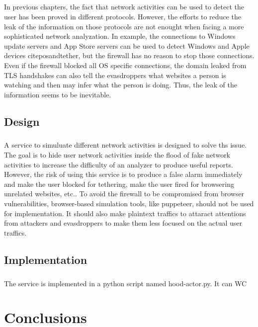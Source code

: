 \documentclass[mscthesis]{usiinfthesis}
\begin{document}
\paragraph{}
In previous chapters, the fact that network activities can be used to detect the user has been proved in different protocols. However, the efforts to reduce the leak of the information on those protocols are not enought when facing a more sophisticated network analyzation. In example, the connections to Windows update servers and App Store servers can be used to detect Windows and Apple devices citep{osandtether}, but the firewall has no reason to stop those connections. Even if the firewall blocked all OS specific connections, the domain leaked from TLS handshakes can also tell the evasdroppers what websites a person is watching and then may infer what the person is doing. Thus, the leak of the information seems to be inevitable.

\section{Design}
\paragraph{}
A service to simuluate different network activities is designed to solve ths issue. The goal is to hide user network activities inside the flood of fake network activities to increase the difficulty of an analyzer to produce useful reports. However, the risk of using this service is to produce a false alarm immediately and make the user blocked for tethering, make the user fired for browsering unrelated websites, etc.. To avoid the firewall to be compromised from browser vulnerabilities, browser-based simulation tools, like puppeteer, should not be used for implementation. It should also make plaintext traffics to attaract attentions from attackers and evasdroppers to make them less focused on the actual user traffics.

\section{Implementation}
\paragraph{}
The service is implemented in a python script named hood-actor.py. It can
WC

\chapter{Conclusions}
\end{document}
